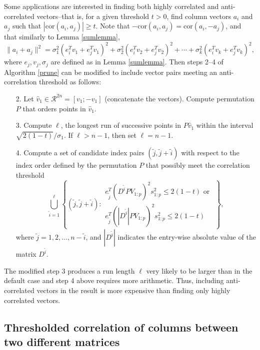 \documentclass{article}
\numberwithin{algorithmctr}{section}
\begin{document}
Some applications are interested in finding both highly correlated and
anti-correlated vectors--that is, for a given threshold $t > 0$, find column
vectors $a_i$ and $a_j$ such that $|\mbox{cor}(a_i, a_j)| \ge t$.
Note that $-\mbox{cor}(a_i, a_j) = \mbox{cor}(a_i, -a_j)$, and that
similarly to Lemma \ref{sumlemma},
\begin{equation*}
\|a_i + a_j\|^2 =
\sigma_1^2 (e_i^Tv_{1} + e_j^Tv_{1})^2 + 
\sigma_2^2 (e_i^Tv_{2} + e_j^Tv_{2})^2 + \cdots + 
\sigma_k^2 (e_i^Tv_{k} + e_j^Tv_{k})^2,
\end{equation*}
where $e_j, v_j, \sigma_j$ are defined as in Lemma \ref{sumlemma}.
Then steps 2--4 of Algorithm \ref{prune} can be modified to include vector pairs meeting an
anti-correlation threshold as follows:
\begin{enumerate}
\item[2.] Let $\hat{v}_1\in\mathcal{R}^{2n}=[v_1; -v_1]$ (concatenate the vectors). Compute permutation
$P$ that orders points in $\hat{v}_1$.
\item[3.] Compute $\ell$, the longest run of successive points in $P \hat{v}_1$ within the interval $\sqrt{2(1-t)}/\sigma_1$. If $\ell > n-1$, then set $\ell = n-1$.
\item[4.] Compute a set of candidate index pairs $(\tilde{j},\tilde{j}+\tilde{i})$ with respect to the index order defined by the permutation $P$ that possibly meet the correlation threshold
\[
\bigcup_{\tilde{i}=1}^\ell
\left\{
(\tilde{j},\tilde{j}+\tilde{i}) :
\begin{array}{l}
e_{\tilde{j}}^T(D^{\tilde{i}} P V_{1:p} )^2 s_{1:p}^2 \le 2(1-t) \mbox{ or }
\\
e_{\tilde{j}}^T(|D^{\tilde{i}}| P V_{1:p} )^2 s_{1:p}^2 \le 2(1-t)
\end{array}
\right\},
\]
where $\tilde{j}=1,2,\ldots,n-\tilde{i}$, and $|D^{\tilde{i}}|$ indicates the entry-wise
absolute value of the matrix $D^{\tilde{i}}$.
\end{enumerate}
The modified step 3 produces a run length $\ell$ very likely to be larger than
in the default case and step 4 above requires more arithmetic. Thus, including
anti-correlated vectors in the result is more expensive than finding
only highly correlated vectors.

\subsection{Thresholded correlation of columns between two different matrices}
\end{document}
